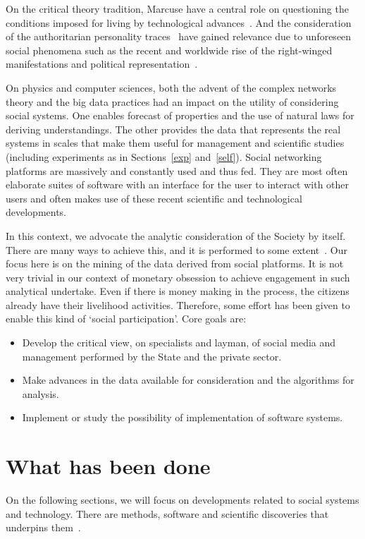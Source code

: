 \documentclass[letterpaper,10pt]{article}
\begin{document}
On the critical theory tradition,
Marcuse have a central role on
questioning the conditions
imposed for living by technological advances~\cite{m1,m2,m3}.
And the consideration of the authoritarian personality traces~\cite{au}
have gained relevance due to unforeseen social phenomena
such as the recent and worldwide rise of the right-winged manifestations
and political representation~\cite{rise,rise2}.

On physics and computer sciences,
both the advent of the complex networks
theory and the big data practices
had an impact on the utility of considering
social systems.
One enables forecast of properties
and the use of natural laws for deriving understandings.
The other provides the data that represents the real systems
in scales that make them useful for management and
scientific studies (including experiments as in Sections~\ref{exp} and~\ref{self}).
Social networking platforms are massively and constantly used and thus fed.
They are most often elaborate suites of software with
an interface for the user to interact with other users
and often makes use of these recent scientific and technological
developments.\cite{tese}

In this context,
we advocate the analytic consideration
of the Society by itself.
There are many ways to achieve this,
and it is performed to some extent~\cite{scriptLattes,losd,p5,an}.
Our focus here is on the mining of the data
derived from social platforms.
It is not very trivial in our context
of monetary obsession to achieve engagement
in such analytical undertake.
Even if there is money making in the process,
the citizens already have their livelihood activities.
Therefore, some effort has been given to
enable this kind of `social participation'.
Core goals are:
\begin{itemize}
	\item Develop the critical view, on specialists and layman,
		of social media and
		management performed by the State and the private sector.
	\item Make advances in the data available for consideration
		and the algorithms for analysis.
	\item Implement or study the possibility of implementation
		of software systems.
\end{itemize}

\section{What has been done}
On the following sections, we will focus on
developments related to social systems and technology.
There are methods, software and scientific discoveries
that underpins them~\cite{stab,tese,kolm}.
\end{document}
